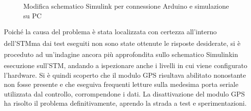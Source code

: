 \begin{figure}[h]
\centering
\hfill
{} 
	

\caption[Modifica schematico Simulink per connessione Arduino e simulazione su PC]{Modifica schematico Simulink per connessione Arduino e simulazione su PC}
\label{fig:modifica schematico Simulink}
\hspace*{\fill}
\end{figure}

\clearpage

Poiché la causa del problema è stata localizzata con certezza all’interno dell’STM\textsuperscript\textregistered\hspace{1mm}ma dai test eseguiti non sono state ottenute le risposte desiderate, si è proceduto ad un’indagine ancora più approfondita sullo schematico Simulink\textsuperscript\textregistered\hspace{1mm}in esecuzione sull’STM\textsuperscript\textregistered, andando a ispezionare anche i livelli in cui viene configurato l'hardware. Si è quindi scoperto che il modulo GPS risultava abilitato nonostante non fosse presente e che eseguiva frequenti letture sulla medesima porta seriale utilizzata dal controllo, corrompendone i dati. La disattivazione del modulo GPS ha risolto il problema definitivamente, aprendo la strada a test e sperimentazioni.


